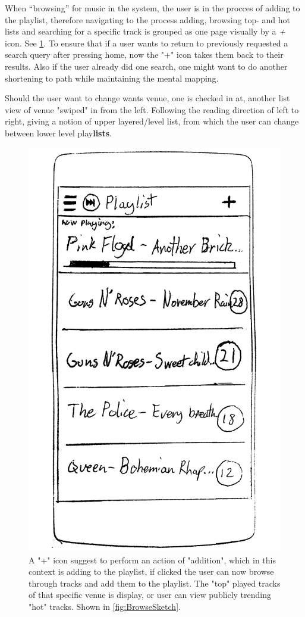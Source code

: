 When \enquote{browsing} for music in the system, the user is in the procces of adding to the playlist, therefore navigating to the process adding, browsing top- and hot lists and searching for a specific track is grouped as one page visually by a \emph{+} icon. See \cref{fig:PlaylistSketch}. To ensure that if a user wants to return to previously requested a search query after pressing home, now the "+" icon takes them back to their results. Also if the user already did one search, one might want to do another shortening to path while maintaining the mental mapping.

Should the user want to change wants venue, one is checked in at, another list view of venue "swiped" in from the left. Following the reading direction of left to right, giving a notion of upper layered/level  list, from which the user can change between lower level play\textbf{lists}.


\begin{figure}
  \centering
  \includegraphics[width=0.5\linewidth]{Images/sketch3.png}
  \caption{A "+" icon suggest to perform an action of "addition", which in this context is adding to the playlist, if clicked the user can now browse through tracks and add them to the playlist. The "top" played tracks of that specific venue is display, or user can view publicly trending "hot" tracks. Shown in \cref{fig:BrowseSketch}.}
  \label{fig:PlaylistSketch}
\end{figure}

